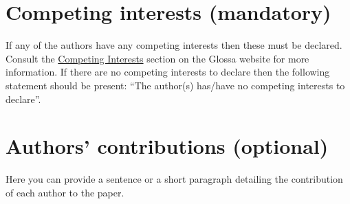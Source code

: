\documentclass[charis,linguex]{glossa}
\begin{document}
\section*{Competing interests (mandatory)}

If any of the authors have any competing interests then these must be declared. Consult the \href{http://www.glossa-journal.org/about/competinginterests/}{Competing Interests} section on the Glossa website for more information. If there are no competing interests to declare then the following statement should be present: ``The author(s) has/have no competing interests to declare''.

\section*{Authors' contributions (optional)}\label{contrib}

Here you can provide a sentence or a short paragraph detailing the contribution of each author to the paper.

\nocite{*} %

\end{document}
